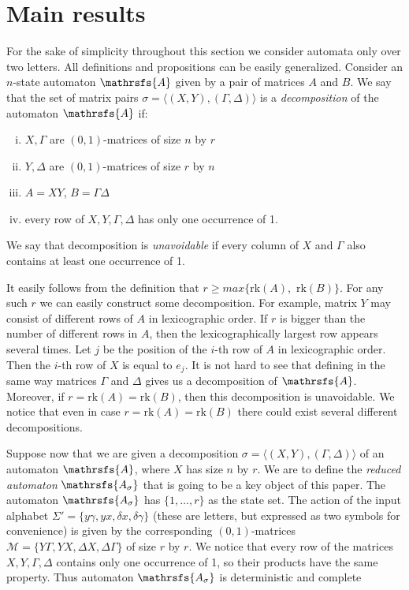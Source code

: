 \documentclass[11pt]{llncs}
\newcommand{\A}{\mathrsfs{A}}
\newcommand{\AD}{\mathrsfs{A_{\sigma}}}
\newcommand{\G}{\Gamma}
\newcommand{\D}{\Delta}
\newcommand{\g}{\gamma}
\newcommand{\dl}{\delta}
\newcommand{\rk}{\mathrm{rk}}
\begin{document}
\section{Main results}
For the sake of simplicity throughout this section we consider automata only over two letters. All definitions and propositions can be
easily generalized. Consider an $n$-state automaton $\A$ given by a pair of matrices $A$ and $B$. We say that the set of matrix pairs
$\sigma = \langle(X,Y), (\G,\D)\rangle$ is a \emph{decomposition} of the automaton $\A$ if:
\begin{enumerate}[(i)]
\item $X, \G$ are $(0,1)$-matrices of size $n$ by $r$
\item $Y, \D$ are $(0,1)$-matrices of size $r$ by $n$
\item $A = XY$, $B = \G\D$
\item every row of $X,Y,\G,\D$ has only one occurrence of 1.
\end{enumerate}
We say that decomposition is \emph{unavoidable} if every column of $X$ and $\G$ also contains at least one occurrence of 1.


It easily follows from the definition that $r \geq max\{\rk(A),$ $\rk(B)\}$. For any such $r$ we can easily construct some decomposition.
For example, matrix $Y$ may consist of different rows of $A$ in lexicographic order. If $r$ is bigger than the number of different rows in
$A$, then the lexicographically largest row appears several times. Let $j$ be the position of the $i$-th row of $A$ in lexicographic order.
Then the $i$-th row of $X$ is equal to $e_j$. It is not hard to see that defining in the same way matrices $\G$ and $\D$ gives us a
decomposition of $\A$. Moreover, if $r = \rk(A) = \rk(B)$, then this decomposition is unavoidable. We notice that even in case $r = \rk(A)
= \rk(B)$ there could exist several different decompositions.

Suppose now that we are given a decomposition $\sigma = \langle(X,Y), (\G,\D)\rangle$ of an automaton $\A$, where $X$ has size $n$ by $r$.
We are to define the \emph{reduced automaton} $\AD$ that is going to be a key object of this paper. The automaton $\AD$ has $\{1,\ldots,
r\}$ as the state set. The action of the input alphabet $\Sigma' = \{ y\g, yx, \dl x, \dl\g \}$ (these are letters, but expressed as two
symbols for convenience) is given by the corresponding $(0,1)$-matrices $\mathcal{M} =\{ Y\G , YX, \D X, \D\G \}$ of size $r$ by $r$. We
notice that every row of the matrices $X, Y, \G, \D$ contains only one occurrence of 1, so their products have the same property. Thus
automaton $\AD$ is deterministic and complete
\end{document}
